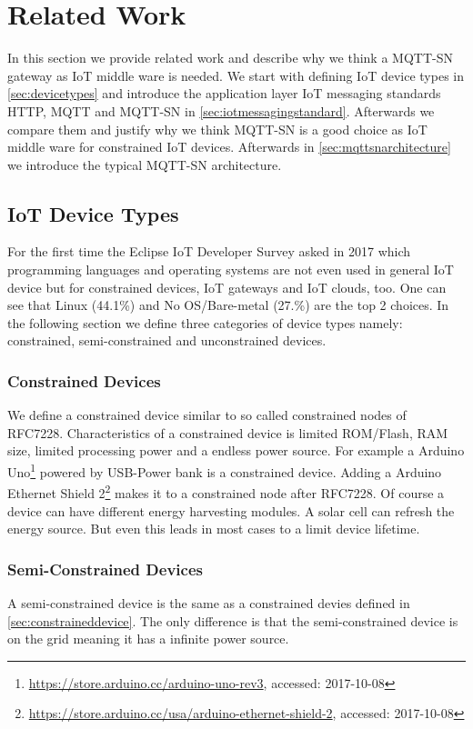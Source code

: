 \section{Related Work}\label{sec:relatedwork}
In this section we provide related work and describe why we think a MQTT-SN gateway as IoT middle ware is needed.
We start with defining IoT device types in \autoref{sec:devicetypes} and introduce the application layer IoT messaging standards HTTP, MQTT and MQTT-SN in \autoref{sec:iotmessagingstandard}. Afterwards we compare them and justify why we think MQTT-SN is a good choice as IoT middle ware for constrained IoT devices.
Afterwards in \autoref{sec:mqttsnarchitecture} we introduce the typical MQTT-SN architecture.

\subsection{IoT Device Types}\label{sec:devicetypes}
For the first time the Eclipse IoT Developer Survey asked in 2017 which programming languages and operating systems are not even used in general IoT device but for constrained devices, IoT gateways and IoT clouds, too\cite{eclipseiotdevelopersurveyresults}.
One can see that Linux (44.1\%) and No OS/Bare-metal (27.\%) are the top 2 choices.
In the following section we define three categories of device types namely: constrained, semi-constrained and unconstrained devices.
\subsubsection{Constrained Devices}\label{sec:constraineddevice}
We define a constrained device similar to so called constrained nodes of RFC7228\cite{RFC7228}.
Characteristics of a constrained device is limited ROM/Flash, RAM size, limited processing power and a endless power source.
For example a Arduino Uno\footnote{\url{https://store.arduino.cc/arduino-uno-rev3}, accessed: 2017-10-08} powered by USB-Power bank is a constrained device.
Adding a Arduino Ethernet Shield 2\footnote{\url{https://store.arduino.cc/usa/arduino-ethernet-shield-2}, accessed: 2017-10-08} makes it to a constrained node after RFC7228.
Of course a device can have different energy harvesting modules.
A solar cell can refresh the energy source. 
But even this leads in most cases to a limit device lifetime.
\subsubsection{Semi-Constrained Devices}\label{sec:semiconstraineddevice}
A semi-constrained device is the same as a constrained devies defined in \autoref{sec:constraineddevice}.
The only difference is that the semi-constrained device is on the grid meaning it has a infinite power source.
